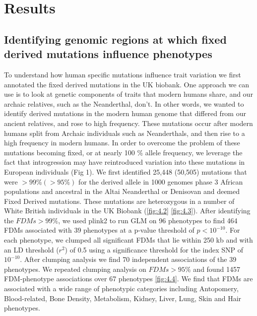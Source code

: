 \section{Results}
\subsection{Identifying genomic regions at which fixed derived mutations influence phenotypes}
To understand how human specific mutations influence trait variation we first annotated the fixed derived mutations in the UK biobank. One approach we can use is to look at genetic components of traits that modern humans share, and our archaic relatives, such as the Neanderthal, don’t. In other words, we wanted to identify derived mutations in the modern human genome that differed from our ancient relatives, and rose to high frequency. These mutations occur after modern humans split from Archaic individuals such as Neanderthals, and then rise to a high frequency in modern humans. In order to overcome the problem of these mutations becoming fixed, or at nearly 100 \% allele frequency, we leverage the fact that introgression may have reintroduced variation into these mutations in European individuals (Fig 1). We first identified  25,448 (50,505) mutations that were $>99\% (>95\%)$ for the derived allele in 1000 genomes phase 3 African populations and ancestral in the Altai Neanderthal or Denisovan and deemed Fixed Derived mutations. These mutations are heterozygous in a number of White British individuals in the UK Biobank (\ref{fig:4.2} \ref{fig:4.3}). After identifying the $FDMs >99\%$, we used plink2 to run GLM on 96 phenotypes to find 464 FDMs associated with 39 phenotypes at a p-value threshold of $p<10^{-10}$.  For each phenotype, we clumped all significant FDMs that lie within 250 kb and with an LD threshold ($r^2$) of 0.5 using a significance threshold for the index SNP of $10^{-10}$. After clumping analysis we find 70 independent associations of the 39 phenotypes.
We repeated clumping analysis on $FDMs > 95\%$ and found 1457 FDM-phenotype associations over 67 phenotypes \ref{fig:4.4}. We find that FDMs are associated with a wide range of phenotypic categories including Antopomery, Blood-related, Bone Density, Metabolism, Kidney, Liver, Lung, Skin and Hair phenotypes. 

